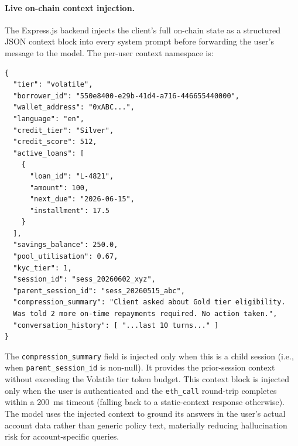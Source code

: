 \documentclass[12pt,a4paper]{report}
\begin{document}
\paragraph{Live on-chain context injection.}
The Express.js backend injects the client's full on-chain state as a structured JSON context block into every system prompt before forwarding the user's message to the model. The per-user context namespace is:
\begin{verbatim}
{
  "tier": "volatile",
  "borrower_id": "550e8400-e29b-41d4-a716-446655440000",
  "wallet_address": "0xABC...",
  "language": "en",
  "credit_tier": "Silver",
  "credit_score": 512,
  "active_loans": [
    {
      "loan_id": "L-4821",
      "amount": 100,
      "next_due": "2026-06-15",
      "installment": 17.5
    }
  ],
  "savings_balance": 250.0,
  "pool_utilisation": 0.67,
  "kyc_tier": 1,
  "session_id": "sess_20260602_xyz",
  "parent_session_id": "sess_20260515_abc",
  "compression_summary": "Client asked about Gold tier eligibility.
  Was told 2 more on-time repayments required. No action taken.",
  "conversation_history": [ "...last 10 turns..." ]
}
\end{verbatim}
The \texttt{compression\_summary} field is injected only when this is a child session (i.e., when \texttt{parent\_session\_id} is non-null). It provides the prior-session context without exceeding the Volatile tier token budget. This context block is injected only when the user is authenticated and the \texttt{eth\_call} round-trip completes within a 200~ms timeout (falling back to a static-context response otherwise). The model uses the injected context to ground its answers in the user's actual account data rather than generic policy text, materially reducing hallucination risk for account-specific queries.
\end{document}

